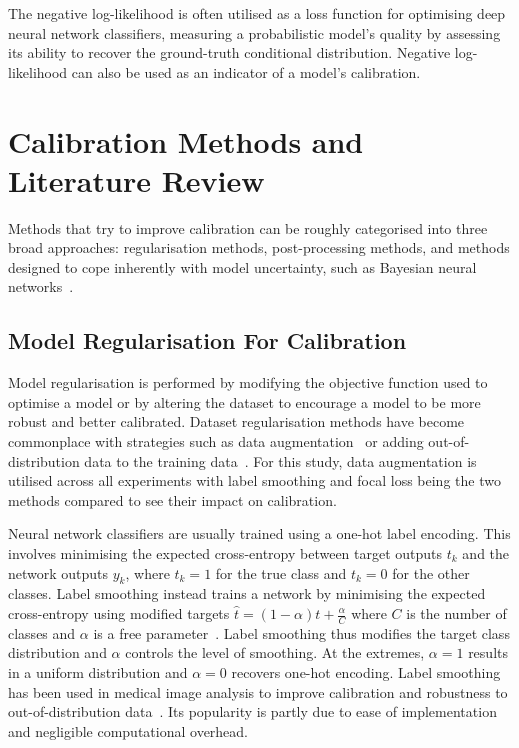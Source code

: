 The negative log-likelihood is often utilised as a loss function for optimising deep neural network classifiers, measuring a probabilistic model's quality by assessing its ability to recover the ground-truth conditional distribution. Negative log-likelihood can also be used as an indicator of a model's calibration.



\section{Calibration Methods and Literature Review}
\label{sec:calibration_review}
Methods that try to improve calibration can be roughly categorised into three broad approaches: regularisation methods, post-processing methods, and methods designed to cope inherently with model uncertainty, such as Bayesian neural networks~\citep{gawlikowski2021survey}.


\subsection{Model Regularisation For Calibration}
Model regularisation is performed by modifying the objective function used to optimise a model or by altering the dataset to encourage a model to be more robust and better calibrated. Dataset regularisation methods have become commonplace with strategies such as data augmentation~\citep{hendrycks2019augmix} or adding out-of-distribution data to the training data~\citep{hendrycks2018deep}. For this study, data augmentation is utilised across all experiments with label smoothing and focal loss being the two methods compared to see their impact on calibration.

Neural network classifiers are usually trained using a one-hot label encoding. This involves minimising the expected cross-entropy between target outputs $t_k$ and the network outputs $y_k$, where $t_k=1$ for the true class and $t_k=0$ for the other classes. Label smoothing instead trains a network by minimising the expected cross-entropy using modified targets $\hat{t} = (1 - \alpha) t + \frac{\alpha}{C}$ where $C$ is the number of classes and $\alpha$ is a free parameter~\citep{szegedy2016rethinking}. Label smoothing thus modifies the target class distribution and $\alpha$ controls the level of smoothing. At the extremes, $\alpha = 1$ results in a uniform distribution and $\alpha = 0$ recovers one-hot encoding. Label smoothing has been used in medical image analysis to improve calibration and robustness to out-of-distribution data~\citep{islam2021spatially}. Its popularity is partly due to ease of implementation and negligible computational overhead. 

